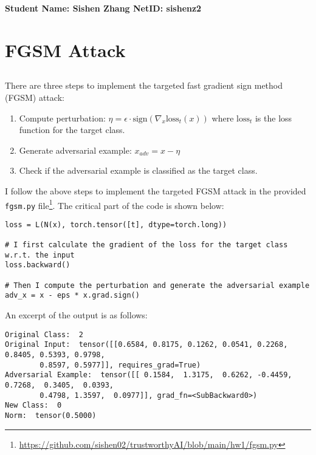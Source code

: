 \documentclass[10pt]{article}
\begin{document}
\vspace*{-0.2in}

\begin{center}
\bf Student Name: Sishen Zhang \hspace{3mm} NetID: sishenz2
\end{center}

\normalsize

\section{FGSM Attack}

\subsection{}

There are three steps to implement the targeted fast gradient sign method (FGSM) attack:
\begin{enumerate}
    \item Compute perturbation: $\eta = \epsilon \cdot \text{sign}(\nabla_x \text{loss}_t(x))$ where $\text{loss}_t$ is the loss function for the target class.
    \item Generate adversarial example: $x_{adv} = x - \eta$
    \item Check if the adversarial example is classified as the target class.
\end{enumerate}

I follow the above steps to implement the targeted FGSM attack in the provided \texttt{fgsm.py} file\footnote{\url{https://github.com/sishen02/trustworthyAI/blob/main/hw1/fgsm.py}}. The critical part of the code is shown below:

\begin{Verbatim}[frame=single]
loss = L(N(x), torch.tensor([t], dtype=torch.long))

# I first calculate the gradient of the loss for the target class w.r.t. the input 
loss.backward()

# Then I compute the perturbation and generate the adversarial example
adv_x = x - eps * x.grad.sign()
\end{Verbatim}

An excerpt of the output is as follows:

\begin{Verbatim}[frame=single]
Original Class:  2
Original Input:  tensor([[0.6584, 0.8175, 0.1262, 0.0541, 0.2268, 0.8405, 0.5393, 0.9798, 
        0.8597, 0.5977]], requires_grad=True)
Adversarial Example:  tensor([[ 0.1584,  1.3175,  0.6262, -0.4459,  0.7268,  0.3405,  0.0393,
        0.4798, 1.3597,  0.0977]], grad_fn=<SubBackward0>)
New Class:  0
Norm:  tensor(0.5000)
\end{Verbatim}
\end{document}
